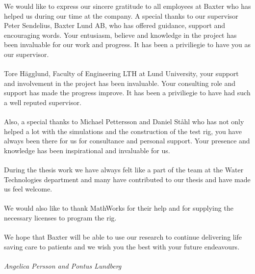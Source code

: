 We would like to express our sincere gratitude to all employees at Baxter who has helped us during our time at the company. A special thanks to our supervisor Peter Sendelius, Baxter Lund AB, who has offered guidance, support and encouraging words. Your entusiasm, believe and knowledge in the project has been invaluable for our work and progress. It has been a priviliegie to have you as our supervisor.\\
\\
Tore Hägglund, Faculty of Engineering LTH at Lund University, your support and involvement in the project has been invaluable. Your consulting role and support has made the progress improve. It has been a priviliegie to have had such a well reputed supervisor.\\
\\
Also, a special thanks to Michael Pettersson and Daniel Ståhl who has not only helped a lot with the simulations and the construction of the test rig, you have always been there for us for consultance and personal support. Your presence and knowledge has been inspirational and invaluable for us. \\
\\
During the thesis work we have always felt like a part of the team at the Water Technologies department and many have contributed to our thesis and have made us feel welcome. \\
\\
We would also like to thank MathWorks for their help and for supplying the necessary licenses to program the rig.\\
\\
We hope that Baxter will be able to use our research to continue delivering life saving care to patients and we wish you the best with your future endeavours. \\
\\

\textit{Angelica Persson and Pontus Lundberg}